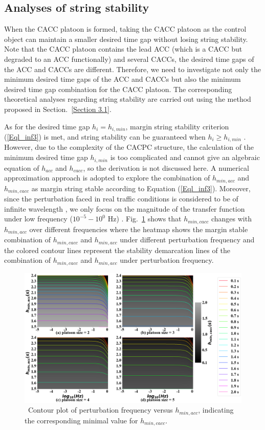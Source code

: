 \documentclass[journal]{IEEEtran}
\begin{document}
\subsection{Analyses of string stability}
\label{Section 4.1}

When the CACC platoon is formed, taking the CACC platoon as the control object can maintain a smaller desired time gap without losing string stability. Note that the CACC platoon contains the lead ACC (which is a CACC but degraded to an ACC functionally) and several CACCs, the desired time gaps of the ACC and CACCs are different. Therefore, we need to investigate not only the minimum desired time gaps of the ACC and CACCs but also the minimum desired time gap combination for the CACC platoon. The corresponding theoretical analyses regarding string stability are carried out using the method proposed in Section.~\ref{Section 3.1}.

As for the desired time gap $h_i=h_{i,min}$, margin string stability criterion (\ref{Eql_inf3}) is met, and string stability can be guaranteed when $h_i\ge h_{i,min}$ \citep{naus2010string}. However, due to the complexity of the CACPC structure, the calculation of the minimum desired time gap $h_{i,min}$ is too complicated and cannot give an algebraic equation of $h_{acc}$ and $h_{cacc}$, so the derivation is not discussed here. A numerical approximation approach is adopted to explore the combination of $h_{min,acc}$ and $h_{min,cacc}$ as margin string stable according to Equation (\ref{Eql_inf3}). Moreover, since the perturbation faced in real traffic conditions is considered to be of infinite wavelength \citep{bian2019reducing,xiao2011practical}, we only focus on the magnitude of the transfer function under low frequency ($10^{-5} - 10^0$ Hz) \citep{Oncu2014}. Fig.~\ref{fig4} shows that $h_{min,cacc}$ changes with $h_{min,acc}$ over different frequencies where the heatmap shows the margin stable combination of $h_{min,cacc}$ and $h_{min,acc}$ under different perturbation frequency and the colored contour lines represent the stability demarcation lines of the combination of $h_{min,cacc}$ and $h_{min,acc}$ under perturbation frequency.

\begin{figure}
  \centering
  \includegraphics[width=14cm]{figs/fig4.png}
  \caption{~Contour plot of perturbation frequency versus $h_{min,acc}$, indicating the corresponding minimal value for $h_{min,cacc}$.}
  \label{fig4}
\end{figure}
\end{document}
